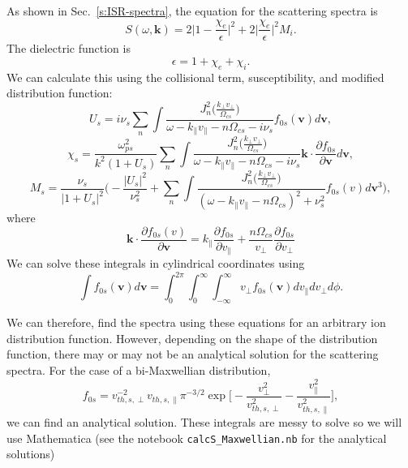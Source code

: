 As shown in Sec.~\ref{s:ISR-spectra}, the equation for the scattering spectra is
\begin{equation}
	S(\omega,\mathbf{k}) = 2 \Big| 1 - \frac{\chi_e}{\epsilon}\Big|^2
	+ 2\Big|\frac{\chi_e}{\epsilon}\Big|^2 M_i.
\end{equation}
The dielectric function is
\begin{equation}
	\epsilon = 1 + \chi_e + \chi_i.
\end{equation}
We can calculate this using the collisional term, susceptibility, and modified distribution function:
\begin{equation}
	U_s = i\nu_s \sum_n \int
	\frac{J_n^2\Big( \tfrac{k_\perp v_\perp}{\Omega_{cs}} \Big)}
	{\omega-k_\parallel v_\parallel - n\Omega_{cs} - i\nu_s}
	f_{0s}(\mathbf{v}) d\mathbf{v} ,
\end{equation}
\begin{equation}
	\chi_s = \frac{\omega_{ps}^2}{k^2(1+U_s)}
	\sum_n \int
	\frac{J_n^2 \Big( \tfrac{k_\perp v_\perp}{\Omega_{cs}} \Big)}
	{\omega-k_\parallel v_\parallel - n\Omega_{cs} - i\nu_s}
	\mathbf{k} \cdot \frac{\partial f_{0s}}{\partial \mathbf{v}} d\mathbf{v},
\end{equation}
\begin{equation}
	M_s = \frac{\nu_s}{|1+U_s|^2}
	\Bigg( - \frac{|U_s|^2}{\nu_s^2} 
	+ \sum_n \int 
	\frac{J_n^2\Big( \tfrac{k_\perp v_\perp}{\Omega_{cs}} \Big)}
	{(\omega - k_\parallel v_\parallel - n\Omega_{cs})^2 + \nu_s^2}
	f_{0s}(v)   d\mathbf{v}^3 \Bigg),
\end{equation}
where 
\begin{equation}
	\mathbf{k} \cdot \frac{\partial f_{0s}(v) }{\partial \mathbf{v}} = 
		k_\parallel \frac{\partial f_{0s}}{\partial v_\parallel}
		+ \frac{n \Omega_{cs}}{v_\perp} \frac{\partial f_{0s}}{\partial v_\perp}
\end{equation}
We can solve these integrals in cylindrical coordinates using 
\begin{equation}
	\int f_{0s}(\mathbf{v}) d\mathbf{v} = \int_0^{2\pi} \int_0^\infty \int_{-\infty}^\infty v_\perp f_{0s}(\mathbf{v}) 
	dv_\parallel dv_\perp d\phi.
\end{equation}

We can therefore, find the spectra using these equations
for an arbitrary ion distribution function.
However, depending on the shape of the distribution function, there may or may not be an
analytical solution for the scattering spectra.
For the case of a bi-Maxwellian distribution, 
\begin{equation}
	f_{0s} = v_{th,s,\perp}^{-2} v_{th,s,\parallel} \pi^{-3/2} 
	\exp\bigg[ - \frac{v_\perp^2}{v_{th,s,\perp}^2} - \frac{v_\parallel^2}{v_{th,s,\parallel}^2} \bigg],
\end{equation}
we can find an analytical solution.
These integrals are messy to solve so we will use Mathematica (see the notebook \verb|calcS_Maxwellian.nb| for the analytical solutions)  %

